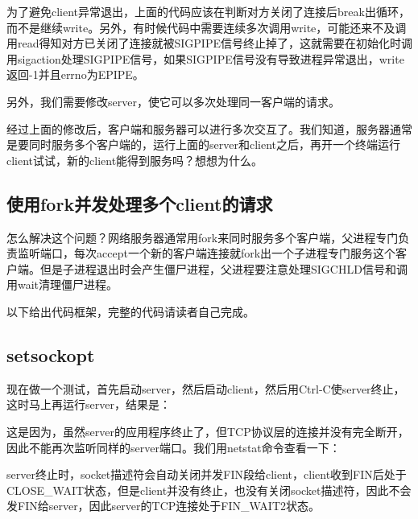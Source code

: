 为了避免client异常退出，上面的代码应该在判断对方关闭了连接后break出循环，而不是继续write。另外，有时候代码中需要连续多次调用write，可能还来不及调用read得知对方已关闭了连接就被SIGPIPE信号终止掉了，这就需要在初始化时调用sigaction处理SIGPIPE信号，如果SIGPIPE信号没有导致进程异常退出，write返回-1并且errno为EPIPE。



另外，我们需要修改server，使它可以多次处理同一客户端的请求。




经过上面的修改后，客户端和服务器可以进行多次交互了。我们知道，服务器通常是要同时服务多个客户端的，运行上面的server和client之后，再开一个终端运行client试试，新的client能得到服务吗？想想为什么。


\subsection{使用fork并发处理多个client的请求}
%


怎么解决这个问题？网络服务器通常用fork来同时服务多个客户端，父进程专门负责监听端口，每次accept一个新的客户端连接就fork出一个子进程专门服务这个客户端。但是子进程退出时会产生僵尸进程，父进程要注意处理SIGCHLD信号和调用wait清理僵尸进程。



以下给出代码框架，完整的代码请读者自己完成。



\subsection{setsockopt}
%


现在做一个测试，首先启动server，然后启动client，然后用Ctrl-C使server终止，这时马上再运行server，结果是：




这是因为，虽然server的应用程序终止了，但TCP协议层的连接并没有完全断开，因此不能再次监听同样的server端口。我们用netstat命令查看一下：




server终止时，socket描述符会自动关闭并发FIN段给client，client收到FIN后处于CLOSE\_\BookSplit{}WAIT状态，但是client并没有终止，也没有关闭socket描述符，因此不会发FIN给server，因此server的TCP连接处于FIN\_\BookSplit{}WAIT2状态。



